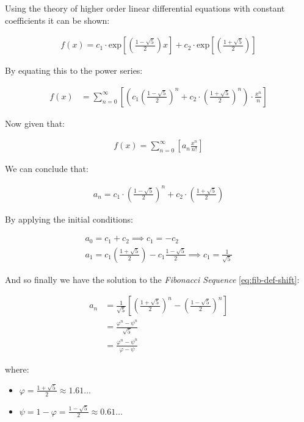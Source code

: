 \documentclass[11pt]{article}
\begin{document}
Using the theory of higher order linear differential equations with
constant coefficients it can be shown:


\begin{align*}
f\left( x \right)= c_1 \cdot  \mathrm{exp}\left[ \left( \frac{1- \sqrt{5} }{2} \right)x \right] +  c_2 \cdot  \mathrm{exp}\left[ \left( \frac{1 +  \sqrt{5} }{2} \right) \right]
\end{align*}


By equating this to the power series:


\begin{align*}
f\left( x \right)&= \sum^{\infty}_{n= 0}   \left[ \left( c_1\left( \frac{1- \sqrt{5} }{2} \right)^n +  c_2 \cdot  \left( \frac{1+ \sqrt{5} }{2} \right)^n \right) \cdot  \frac{x^n}{n} \right]
\end{align*}


Now given that:


\begin{align*}
f\left( x \right)= \sum^{\infty}_{n= 0}   \left[ a_n \frac{x^n}{n!} \right]
\end{align*}


We can conclude that:


\begin{align*}
a_n = c_1\cdot  \left( \frac{1- \sqrt{5} }{2} \right)^n +  c_2 \cdot  \left( \frac{1+  \sqrt{5} }{2} \right)
\end{align*}


By applying the initial conditions:


\begin{align*}
a_0= c_1 +  c_2  \implies  c_1= - c_2\\
a_1= c_1 \left( \frac{1+ \sqrt{5} }{2} \right) -  c_1 \frac{1-\sqrt{5} }{2}  \implies  c_1 = \frac{1}{\sqrt{5} }
\end{align*}


And so finally we have the solution to the \emph{Fibonacci Sequence} \ref{eq:fib-def-shift}:


\begin{align}
    a_n &= \frac{1}{\sqrt{5} } \left[ \left( \frac{1+  \sqrt{5} }{2}  \right)^n -  \left( \frac{1- \sqrt{5} }{2} \right)^n \right] \nonumber \\
&= \frac{\varphi^n - \psi^n}{\sqrt{5} } \nonumber\\
&=\frac{\varphi^n -  \psi^n}{\varphi - \psi} \label{eq:fib-sol}
\end{align}


where:

\begin{itemize}
\item \(\varphi = \frac{1+ \sqrt{5} }{2} \approx 1.61\ldots\)
\item \(\psi = 1-\varphi = \frac{1- \sqrt{5} }{2} \approx 0.61\ldots\)
\end{itemize}
\end{document}

